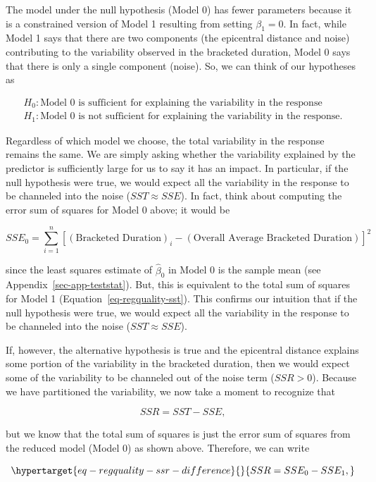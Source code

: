 \documentclass[
  letterpaper,
  DIV=11,
  numbers=noendperiod]{scrreprt}
\theoremstyle{definition}
\theoremstyle{definition}
\theoremstyle{plain}
\theoremstyle{remark}
\begin{document}
The model under the null hypothesis (Model 0) has fewer parameters
because it is a constrained version of Model 1 resulting from setting
\(\beta_1 = 0\). In fact, while Model 1 says that there are two
components (the epicentral distance and noise) contributing to the
variability observed in the bracketed duration, Model 0 says that there
is only a single component (noise). So, we can think of our hypotheses
as

\[
\begin{aligned}
  H_0: \text{Model 0 is sufficient for explaining the variability in the response} \\
  H_1: \text{Model 0 is not sufficient for explaining the variability in the response.}
\end{aligned}
\]

Regardless of which model we choose, the total variability in the
response remains the same. We are simply asking whether the variability
explained by the predictor is sufficiently large for us to say it has an
impact. In particular, if the null hypothesis were true, we would expect
all the variability in the response to be channeled into the noise
(\(SST \approx SSE\)). In fact, think about computing the error sum of
squares for Model 0 above; it would be

\[SSE_0 = \sum_{i=1}^{n} \left[(\text{Bracketed Duration})_i - (\text{Overall Average Bracketed Duration})\right]^2\]

since the least squares estimate of \(\widehat{\beta}_0\) in Model 0 is
the sample mean (see Appendix~\ref{sec-app-teststat}). But, this is
equivalent to the total sum of squares for Model 1
(Equation~\ref{eq-regquality-sst}). This confirms our intuition that if
the null hypothesis were true, we would expect all the variability in
the response to be channeled into the noise (\(SST \approx SSE\)).

If, however, the alternative hypothesis is true and the epicentral
distance explains some portion of the variability in the bracketed
duration, then we would expect some of the variability to be channeled
out of the noise term (\(SSR > 0\)). Because we have partitioned the
variability, we now take a moment to recognize that

\[SSR = SST - SSE,\]

but we know that the total sum of squares is just the error sum of
squares from the reduced model (Model 0) as shown above. Therefore, we
can write

\begin{equation}\protect\hypertarget{eq-regquality-ssr-difference}{}{SSR = SSE_0 - SSE_1,}\label{eq-regquality-ssr-difference}\end{equation}
\end{document}
